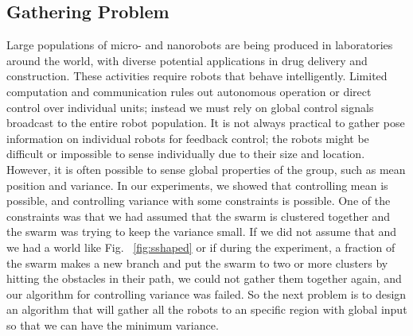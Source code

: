   \subsection{Gathering Problem}
Large populations of micro- and nanorobots are being produced in laboratories around the world, with diverse potential applications in drug delivery and construction. These activities require robots that behave intelligently. Limited computation and communication rules out autonomous operation or direct control over individual units; instead we must rely on global control signals broadcast to the entire robot population. It is not always practical to gather pose information on individual robots for feedback control; the robots might be difficult or impossible to sense individually due to their size and location. 
However, it is often possible to sense global properties of the group, such as mean position and variance. In our experiments, we showed that controlling mean is possible, and controlling variance with some constraints is possible. One of the constraints was that we had assumed that the swarm is clustered together and the swarm was trying to keep the variance small. If we did not assume that and we had a world like Fig. ~\ref{fig:sshaped} or if during the experiment, a fraction of the swarm makes a new branch and put the swarm to two or more clusters by hitting the obstacles in their path, we could not gather them together again, and our algorithm for controlling variance was failed. So the next problem is to design an algorithm that will gather all the robots to an specific region with global input so that we can have the minimum variance. \\

